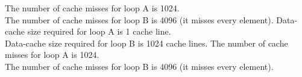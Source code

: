 \documentclass[11pt]{article}
\begin{document}
\newpage


\begin{Parts}
	\Part
	The number of cache misses for loop A is 1024. \\
	The number of cache misses for loop B is 4096 (it misses every element).
	\Part
	Data-cache size required for loop A is 1 cache line. \\
	Data-cache size required for loop B is 1024 cache lines.
	\Part
	The number of cache misses for loop A is 1024. \\
	The number of cache misses for loop B is 4096 (it misses every element).
\end{Parts}
\newpage

\end{document}
